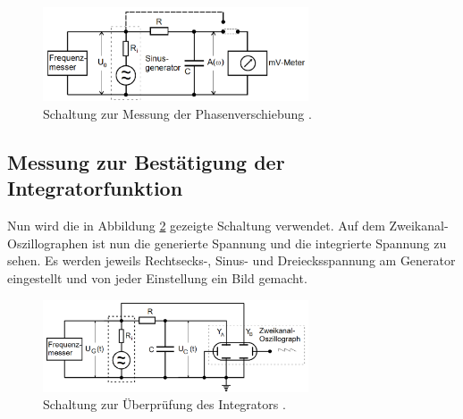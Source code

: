 \begin{figure}
    \centering
    \includegraphics[width=0.7\textwidth]{Phasenverschiebung_Schaltkreis.png}
    \caption{Schaltung zur Messung der Phasenverschiebung \cite{sample}.}
    \label{fig:SchaltungPhasenverschiebung}
\end{figure}

\subsection{Messung zur Bestätigung der Integratorfunktion}
\label{sec:Integratorfunktion}

Nun wird die in Abbildung \ref{fig:Integrator} gezeigte Schaltung verwendet. Auf dem Zweikanal-Oszillographen 
ist nun die generierte Spannung und die integrierte Spannung zu sehen. Es werden jeweils Rechtsecks-, Sinus- und
Dreiecksspannung am Generator eingestellt und von jeder Einstellung ein Bild gemacht.

\begin{figure}
    \centering
    \includegraphics[width=0.7\textwidth]{Integrator.png}
    \caption{Schaltung zur Überprüfung des Integrators \cite{sample}.}
    \label{fig:Integrator}
\end{figure}
